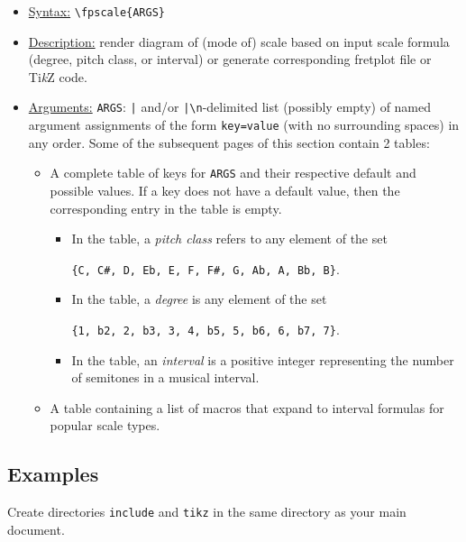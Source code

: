 \documentclass[12pt,letterpaper]{article}
\begin{document}
\begin{itemize}
  \item[] \uline{Syntax:} \texttt{\textbackslash fpscale\{ARGS\}}
  \item[] \uline{Description:} render diagram of (mode of) scale based on input scale formula (degree, pitch class, or interval) or generate corresponding fretplot file or Ti\textit{k}Z code.
  \item[] \uline{Arguments:} \texttt{ARGS}: \texttt{|} and/or \texttt{|\textbackslash n}-delimited list (possibly empty) of named argument assignments of the form \texttt{key=value} (with no surrounding spaces) in any order. Some of the subsequent pages of this section contain 2 tables:
    \begin{itemize}
    \item A complete table of keys for \texttt{ARGS} and their respective default and possible values. If a key does not have a default value, then the corresponding entry in the table is empty.
        \begin{itemize}
        \item In the table, a \textit{pitch class} refers to any element of the set
\begin{center}
\texttt{\{C, C\#, D, Eb, E, F, F\#, G, Ab, A, Bb, B\}}.
\end{center}
\item In the table, a \textit{degree} is any element of the set
\begin{center}
\texttt{\{1, b2, 2, b3, 3, 4, b5, 5, b6, 6, b7, 7\}}.
\end{center}
\item In the table, an \textit{interval} is a positive integer representing the number of semitones in a musical interval.
        \end{itemize}
    \item A table containing a list of macros that expand to interval formulas for popular scale types.
    \end{itemize}
\end{itemize}

\subsection{Examples}

Create directories \texttt{include} and \texttt{tikz} in the same directory as your main document.
\end{document}
